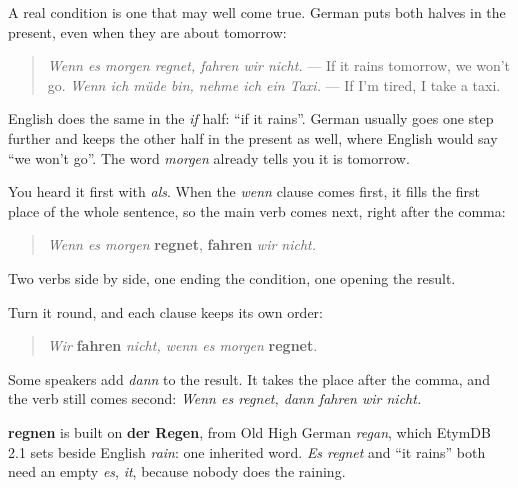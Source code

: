 \begin{grammarlens}[title={Grammar Lens: the present, for tomorrow too}]
A real condition is one that may well come true. German puts both halves in the present, even when they are about tomorrow:

\begin{quote}
\emph{Wenn es morgen regnet, fahren wir nicht.} — If it rains tomorrow, we won't go. \emph{Wenn ich müde bin, nehme ich ein Taxi.} — If I'm tired, I take a taxi.
\end{quote}

English does the same in the \emph{if} half: \textquotedblleft{}if it rains\textquotedblright{}. German usually goes one step further and keeps the other half in the present as well, where English would say \textquotedblleft{}we won't go\textquotedblright{}. The word \emph{morgen} already tells you it is tomorrow.
\end{grammarlens}

\begin{culture}
You heard it first with \emph{als}. When the \emph{wenn} clause comes first, it fills the first place of the whole sentence, so the main verb comes next, right after the comma:

\begin{quote}
\emph{Wenn es morgen} \textbf{regnet}, \textbf{fahren} \emph{wir nicht.}
\end{quote}

Two verbs side by side, one ending the condition, one opening the result.

Turn it round, and each clause keeps its own order:

\begin{quote}
\emph{Wir} \textbf{fahren} \emph{nicht, wenn es morgen} \textbf{regnet}.
\end{quote}

Some speakers add \emph{dann} to the result. It takes the place after the comma, and the verb still comes second: \emph{Wenn es regnet, dann fahren wir nicht.}
\end{culture}

\begin{cousinweb}
\textbf{regnen} is built on \textbf{der Regen}, from Old High German \emph{regan}, which EtymDB 2.1 sets beside English \emph{rain}: one inherited word. \emph{Es regnet} and \textquotedblleft{}it rains\textquotedblright{} both need an empty \emph{es}, \emph{it}, because nobody does the raining.
\end{cousinweb}

